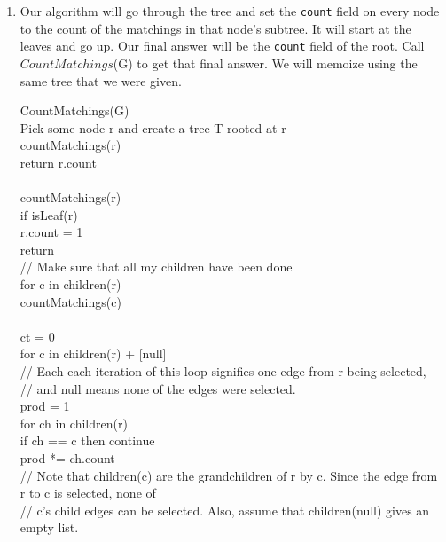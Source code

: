 \documentclass[11pt]{article}
\begin{document}
\begin{solution}
    \begin{enumerate}
        \item Our algorithm will go through the tree and set the \texttt{count} field on every node to the count of the matchings in that node's subtree. It will start at the leaves and go up. Our final answer will be the \texttt{count} field of the root. Call $CountMatchings$(G) to get that final answer. We will memoize using the same tree that we were given.
            \begin{algo}
                CountMatchings(G) \+
                \\ Pick some node r and create a tree T rooted at r
                \\ countMatchings(r)
                \\ return r.count \-
                \\ 
                \\ countMatchings(r) \+
                \\ if isLeaf(r) \+
                \\ r.count = 1
                \\ return \-
                \\ // Make sure that all my children have been done
                \\ for c in children(r) \+
                \\ countMatchings(c) \-
                \\ 
                \\ ct = 0
                \\ for c in children(r) + [null] \+
                \\ // Each each iteration of this loop signifies one edge from r being selected, 
                \\ // and null means none of the edges were selected.
                \\ prod = 1 
                \\ for ch in children(r) \+
                \\ if ch == c then continue
                \\ prod *= ch.count \-
                \\ // Note that children(c) are the grandchildren of r by c. Since the edge from r to c is selected, none of
                \\ // c's child edges can be selected. Also, assume that children(null) gives an empty list.

\end{algo}
\end{enumerate}
\end{solution}
\end{document}
